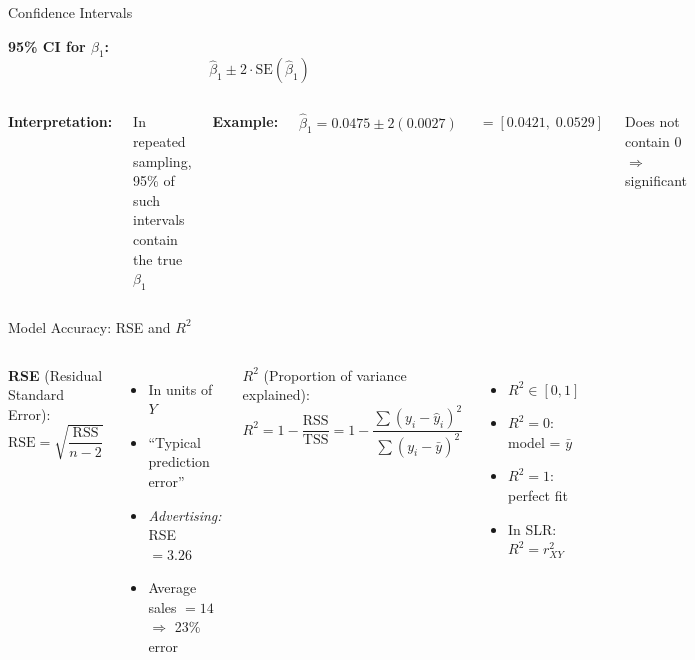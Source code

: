 \documentclass[aspectratio=169, 11pt]{beamer}
\begin{document}
\begin{frame}{Confidence Intervals}

\textbf{95\% CI for $\beta_1$:}
$$\hat{\beta}_1 \pm 2 \cdot \text{SE}(\hat{\beta}_1)$$

\vspace{0.3em}
\begin{columns}
\textbf{Interpretation:}

In repeated sampling, 95\% of such intervals contain the true $\beta_1$

\vspace{0.5em}
\textbf{Example:}

$\hat{\beta}_1 = 0.0475 \pm 2(0.0027)$

$= [0.0421, \; 0.0529]$

\vspace{0.3em}
\textcolor{softgreen}{Does not contain 0} $\Rightarrow$ significant

\end{columns}
\end{frame}


\begin{frame}{Model Accuracy: RSE and $R^2$}
\begin{columns}
\textbf{RSE} (Residual Standard Error):
$$\text{RSE} = \sqrt{\frac{\text{RSS}}{n - 2}}$$

\begin{itemize}
  \item In units of $Y$
  \item ``Typical prediction error''
  \item \textit{Advertising:} RSE $= 3.26$
  \item Average sales $= 14$ $\Rightarrow$ 23\% error
\end{itemize}

\textbf{$R^2$} (Proportion of variance explained):
$$R^2 = 1 - \frac{\text{RSS}}{\text{TSS}} = 1 - \frac{\sum(y_i - \hat{y}_i)^2}{\sum(y_i - \bar{y})^2}$$

\begin{itemize}
  \item $R^2 \in [0, 1]$
  \item $R^2 = 0$: model = $\bar{y}$
  \item $R^2 = 1$: perfect fit
  \item In SLR: $R^2 = r_{XY}^2$
\end{itemize}
\end{columns}
\end{frame}
\end{document}
